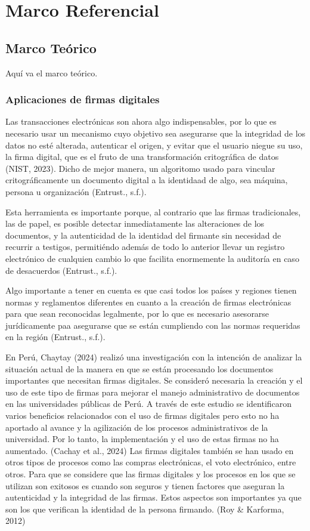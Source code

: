 \documentclass[a4paper,12pt]{report}
\begin{document}
\chapter{Marco Referencial}
\section{Marco Teórico}
Aquí va el marco teórico.
\subsection{Aplicaciones de firmas digitales}

Las transacciones electrónicas son ahora algo indispensables, por lo que es necesario usar un mecanismo cuyo objetivo sea asegurarse que la integridad de los datos no esté alterada, autenticar el origen, y evitar que el usuario niegue su uso, la firma digital, que es el fruto de una transformación critográfica de datos (NIST, 2023). Dicho de mejor manera, un algoritomo usado para vincular critográficamente un documento digital a la identidaad de algo, sea máquina, persona u organización (Entrust., s.f.).  

Esta herramienta es importante porque, al contrario que las firmas tradicionales, las de papel, es posible detectar inmediatamente las alteraciones de los documentos, y  la autenticidad de la identidad del firmante sin necesidad de recurrir a testigos, permitiéndo además de todo lo anterior llevar un registro electrónico de cualquien cambio lo que facilita enormemente la auditoría en caso de desacuerdos (Entrust., s.f.).

Algo importante a tener en cuenta es que casi todos los países y regiones tienen normas y reglamentos diferentes en cuanto a la creación de firmas electrónicas para que sean reconocidas legalmente, por lo que es necesario asesorarse jurídicamente paa asegurarse que se están cumpliendo con las normas requeridas en la región (Entrust., s.f.).

En Perú, Chaytay (2024) realizó una investigación con la intención de analizar la situación actual de la manera en que se están procesando los documentos importantes que necesitan firmas digitales. Se consideró necesaria la creación y el uso de este tipo de firmas para mejorar el manejo administrativo de documentos en las universidades públicas de Perú. A través de este estudio se identificaron varios beneficios relacionados con el uso de firmas digitales pero esto no ha aportado al avance y la agilización de los procesos administrativos de la universidad. Por lo tanto, la implementación y el uso de estas firmas no ha aumentado. (Cachay et al., 2024) Las firmas digitales también se han usado en otros tipos de procesos como las compras electrónicas, el voto electrónico, entre otros. Para que se considere que las firmas digitales y los procesos en los que se utilizan son exitosos es cuando son seguros y tienen factores que aseguran la autenticidad y la integridad de las firmas. Estos aspectos son importantes ya que son los que verifican la identidad de la persona firmando. (Roy & Karforma, 2012)
\end{document}
